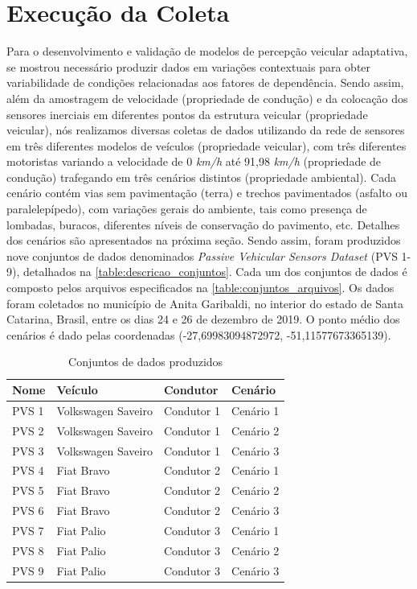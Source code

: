 \section{Execução da Coleta}

Para o desenvolvimento e validação de modelos de percepção veicular adaptativa, se mostrou necessário produzir dados em variações contextuais para obter variabilidade de condições relacionadas aos fatores de dependência. Sendo assim, além da amostragem de velocidade (propriedade de condução) e da colocação dos sensores inerciais em diferentes pontos da estrutura veicular (propriedade veicular), nós realizamos diversas coletas de dados utilizando da rede de sensores em três diferentes modelos de veículos (propriedade veicular), com três diferentes motoristas variando a velocidade de 0 \emph{km/h} até 91,98 \emph{km/h} (propriedade de condução) trafegando em três cenários distintos (propriedade ambiental). Cada cenário contém vias sem pavimentação (terra) e trechos pavimentados (asfalto ou paralelepípedo), com variações gerais do ambiente, tais como presença de lombadas, buracos, diferentes níveis de conservação do pavimento, etc. Detalhes dos cenários são apresentados na próxima seção. Sendo assim, foram produzidos nove conjuntos de dados denominados \textit{Passive Vehicular Sensors Dataset} (PVS 1-9), detalhados na \autoref{table:descricao_conjuntos}. Cada um dos conjuntos de dados é composto pelos arquivos especificados na \autoref{table:conjuntos_arquivos}. Os dados foram coletados no município de Anita Garibaldi, no interior do estado de Santa Catarina, Brasil, entre os dias 24 e 26 de dezembro de 2019. O ponto médio dos cenários é dado pelas coordenadas (-27,69983094872972, -51,11577673365139).

\begin{table}[H]
\small
\caption{Conjuntos de dados produzidos} 
\label{table:descricao_conjuntos}
\centering
\begin{tabular}{llll}
\toprule
\textbf{Nome} & \textbf{Veículo} & \textbf{Condutor} & \textbf{Cenário} \\ \midrule
PVS 1 & Volkswagen Saveiro & Condutor 1 & Cenário 1 \\ \midrule
PVS 2 & Volkswagen Saveiro & Condutor 1 & Cenário 2 \\ \midrule
PVS 3 & Volkswagen Saveiro & Condutor 1 & Cenário 3 \\ \midrule
PVS 4 & Fiat Bravo & Condutor 2 & Cenário 1 \\ \midrule
PVS 5 & Fiat Bravo & Condutor 2 & Cenário 2 \\ \midrule
PVS 6 & Fiat Bravo & Condutor 2 & Cenário 3 \\ \midrule
PVS 7 & Fiat Palio & Condutor 3 & Cenário 1 \\ \midrule
PVS 8 & Fiat Palio & Condutor 3 & Cenário 2 \\ \midrule
PVS 9 & Fiat Palio & Condutor 3 & Cenário 3 \\ \bottomrule
\end{tabular}
\end{table}

